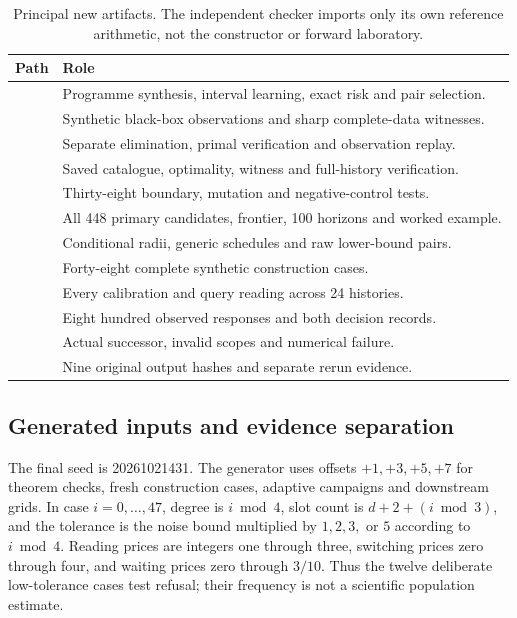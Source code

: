 \documentclass[11pt,letterpaper]{article}
\theoremstyle{definition}\newtheorem{definition}[theorem]{Definition}
\theoremstyle{remark}\newtheorem{remark}[theorem]{Remark}
\begin{document}
\begin{table}[htbp]\centering\small
\caption{Principal new artifacts. The independent checker imports only its own reference arithmetic, not the constructor or forward laboratory.}
\begin{tabularx}{\linewidth}{@{}P{.43\linewidth}Y@{}}\toprule
Path & Role\\\midrule
{} & Programme synthesis, interval learning, exact risk and pair selection.\\
 & Synthetic black-box observations and sharp complete-data witnesses.\\
 & Separate elimination, primal verification and observation replay.\\
 & Saved catalogue, optimality, witness and full-history verification.\\
 & Thirty-eight boundary, mutation and negative-control tests.\\
 & All 448 primary candidates, frontier, 100 horizons and worked example.\\
 & Conditional radii, generic schedules and raw lower-bound pairs.\\
 & Forty-eight complete synthetic construction cases.\\
 & Every calibration and query reading across 24 histories.\\
 & Eight hundred observed responses and both decision records.\\
 & Actual successor, invalid scopes and numerical failure.\\
 & Nine original output hashes and separate rerun evidence.\\\bottomrule
\end{tabularx}
\end{table}

\subsection{Generated inputs and evidence separation}
The final seed is 20261021431. The generator uses offsets $+1,+3,+5,+7$ for theorem checks, fresh construction cases, adaptive campaigns and downstream grids. In case $i=0,\ldots,47$, degree is $i\bmod4$, slot count is $d+2+(i\bmod3)$, and the tolerance is the noise bound multiplied by $1,2,3,$ or $5$ according to $i\bmod4$. Reading prices are integers one through three, switching prices zero through four, and waiting prices zero through $3/10$. Thus the twelve deliberate low-tolerance cases test refusal; their frequency is not a scientific population estimate.
\end{document}
